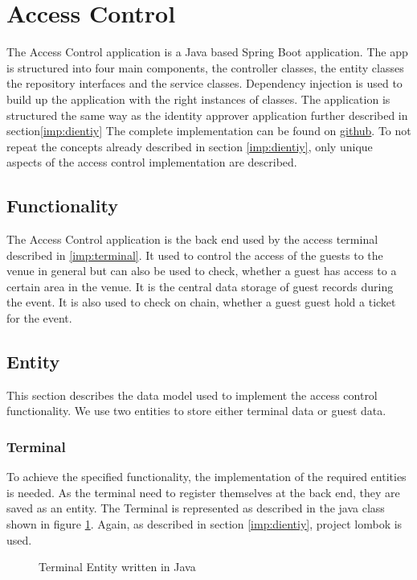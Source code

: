 \section{Access Control}
The Access Control application is a Java based Spring Boot application. The app is structured into four main components, the controller classes, the entity classes the repository interfaces and the service classes. Dependency injection is used to build up the application with the right instances of classes. The application is structured the same way as the identity approver application further described in section\ref{imp:dientiy} The complete implementation can be found on \href{https://github.com/bc-ticketing/host-backend}{github}. To not repeat the concepts already described in section \ref{imp:dientiy}, only unique aspects of the access control implementation are described. 

\subsection{Functionality}
The Access Control application is the back end used by the access terminal described in \ref{imp:terminal}. It used to control the access of the guests to the venue in general but can also be used to check, whether a guest has access to a certain area in the venue. It is the central data storage of guest records during the event. It is also used to check on chain, whether a guest guest hold a ticket for the event.  

\subsection{Entity}
This section describes the data model used to implement the access control functionality. We use two entities to store either terminal data or guest data.


\subsubsection{Terminal}
To achieve the specified functionality, the implementation of the required entities is needed. As the terminal need to register themselves at the back end, they are saved as an entity. The Terminal is represented as described in the java class shown in figure \ref{code:entity:access}. Again, as described in section \ref{imp:dientiy}, project lombok is used. 

\begin{figure}[H]
    
    \caption{Terminal Entity written in Java}
    \label{code:entity:access}
\end{figure}

